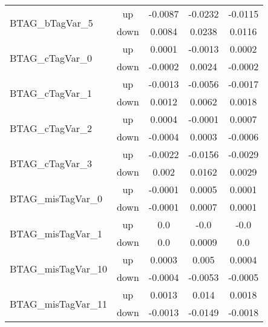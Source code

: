 \begin{table}[h!]
\begin{tabular}{lcccc}
\multirow{2}{*}{BTAG\_bTagVar\_5}      & up   &     -0.0087     &     -0.0232     &     -0.0115      \\
                                       & down &     0.0084     &     0.0238     &     0.0116       \\ \hline
\multirow{2}{*}{BTAG\_cTagVar\_0}      & up   &     0.0001     &     -0.0013     &     0.0002      \\
                                       & down &     -0.0002     &     0.0024     &     -0.0002       \\ \hline
\multirow{2}{*}{BTAG\_cTagVar\_1}      & up   &     -0.0013     &     -0.0056     &     -0.0017      \\
                                       & down &     0.0012     &     0.0062     &     0.0018       \\ \hline
\multirow{2}{*}{BTAG\_cTagVar\_2}      & up   &     0.0004     &     -0.0001     &     0.0007      \\
                                       & down &     -0.0004     &     0.0003     &     -0.0006       \\ \hline
\multirow{2}{*}{BTAG\_cTagVar\_3}      & up   &     -0.0022     &     -0.0156     &     -0.0029      \\
                                       & down &     0.002     &     0.0162     &     0.0029       \\ \hline
\multirow{2}{*}{BTAG\_misTagVar\_0}      & up   &     -0.0001     &     0.0005     &     0.0001      \\
                                       & down &     -0.0001     &     0.0007     &     0.0001       \\ \hline
\multirow{2}{*}{BTAG\_misTagVar\_1}      & up   &     0.0     &     -0.0     &     -0.0      \\
                                       & down &     0.0     &     0.0009     &     0.0       \\ \hline
\multirow{2}{*}{BTAG\_misTagVar\_10}      & up   &     0.0003     &     0.005     &     0.0004      \\
                                       & down &     -0.0004     &     -0.0053     &     -0.0005       \\ \hline
\multirow{2}{*}{BTAG\_misTagVar\_11}      & up   &     0.0013     &     0.014     &     0.0018      \\
                                       & down &     -0.0013     &     -0.0149     &     -0.0018       \\ \hline

\end{tabular}
\end{table}
